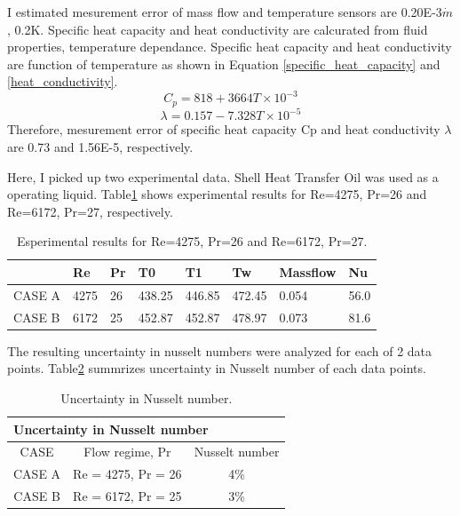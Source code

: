 \documentclass[conference]{IEEEtran}
\begin{document}
I estimated mesurement error of mass flow and temperature sensors are 0.20E-3$\dot{m}$, 0.2K.
Specific heat capacity and heat conductivity are calcurated from fluid properties, temperature dependance.
Specific heat capacity and heat conductivity are function of temperature as shown in Equation \ref{specific_heat_capacity} and \ref{heat_conductivity}.
\begin{equation}
C_{p} = 818 + 3664T \times 10^{-3} \label{specific_heat_capacity}
\end{equation}
\begin{equation}
\lambda = 0.157 - 7.328T \times 10^{-5} \label{heat_conductivity}
\end{equation}
Therefore, mesurement error of specific heat capacity Cp and heat conductivity $\lambda$ are 0.73 and 1.56E-5, respectively.

Here, I picked up two experimental data.
Shell Heat Transfer Oil was used as a operating liquid.
Table\ref{experimental_result} shows experimental results for Re=4275, Pr=26 and Re=6172, Pr=27, respectively.

\begin{table}[h]
 \caption{Esperimental results for Re=4275, Pr=26 and Re=6172, Pr=27.}
 \label{experimental_result}
 \centering
\begin{tabular}{llllllll}
\hline
       & Re   & Pr & T0    & T1    & Tw     & Massflow & Nu   \\ \hline
CASE A & 4275 & 26 & 438.25 & 446.85 & 472.45 & 0.054    & 56.0 \\
CASE B & 6172 & 25 & 452.87 & 452.87 & 478.97 & 0.073    & 81.6
\end{tabular}
\end{table}

The resulting uncertainty in nusselt numbers were analyzed for each of 2 data points.
Table\ref{uncertainty_in_Nusselt_number} summrizes uncertainty in Nusselt number of each data points.

\begin{table}[h]
 \caption{Uncertainty in Nusselt number.}
 \label{uncertainty_in_Nusselt_number}
 \centering
\begin{tabular}{clc}
\hline
\multicolumn{3}{l}{Uncertainty in Nusselt number}         \\ \hline
CASE   & \multicolumn{1}{c}{Flow regime, Pr} & Nusselt number \\ \hline
CASE A & Re = 4275, Pr = 26              & 4\%            \\
CASE B & Re = 6172, Pr = 25              & 3\%           
\end{tabular}
\end{table}
\end{document}
